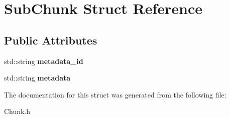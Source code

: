 \hypertarget{structSubChunk}{}\section{Sub\+Chunk Struct Reference}
\label{structSubChunk}
\subsection*{Public Attributes}
\begin{DoxyCompactItemize}
\item 
\mbox{\label{structSubChunk_a13719800ff63084da9e2ae5f142413ed}} 
std\+::string {\bfseries metadata\+\_\+id}
\item 
\mbox{\label{structSubChunk_a284b8610a9cf8c6178efe076b72ceca1}} 
std\+::string {\bfseries metadata}
\end{DoxyCompactItemize}


The documentation for this struct was generated from the following file\+:\begin{DoxyCompactItemize}
\item 
Chunk.\+h\end{DoxyCompactItemize}
